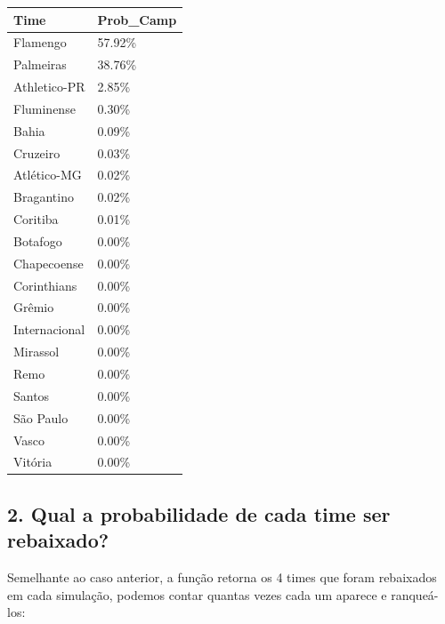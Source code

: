 \documentclass[11pt,]{article}
\begin{document}
\begin{longtable}[]{@{}ll@{}}
\toprule\noalign{}
Time & Prob\_Camp \\
\midrule\noalign{}
\endhead
\bottomrule\noalign{}
\endlastfoot
Flamengo & 57.92\% \\
Palmeiras & 38.76\% \\
Athletico-PR & 2.85\% \\
Fluminense & 0.30\% \\
Bahia & 0.09\% \\
Cruzeiro & 0.03\% \\
Atlético-MG & 0.02\% \\
Bragantino & 0.02\% \\
Coritiba & 0.01\% \\
Botafogo & 0.00\% \\
Chapecoense & 0.00\% \\
Corinthians & 0.00\% \\
Grêmio & 0.00\% \\
Internacional & 0.00\% \\
Mirassol & 0.00\% \\
Remo & 0.00\% \\
Santos & 0.00\% \\
São Paulo & 0.00\% \\
Vasco & 0.00\% \\
Vitória & 0.00\% \\
\end{longtable}

\newpage

\hypertarget{qual-a-probabilidade-de-cada-time-ser-rebaixado}{%
\subsection{2. Qual a probabilidade de cada time ser
rebaixado?}\label{qual-a-probabilidade-de-cada-time-ser-rebaixado}}

Semelhante ao caso anterior, a função retorna os 4 times que foram
rebaixados em cada simulação, podemos contar quantas vezes cada um
aparece e ranqueá-los:
\end{document}
